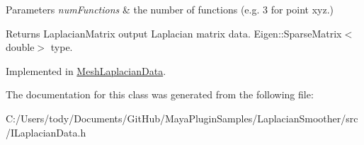 \begin{DoxyParams}{Parameters}
{\em num\+Functions} & the number of functions (e.\+g. 3 for point xyz.) \\
\hline
\end{DoxyParams}
\begin{DoxyReturn}{Returns}
Laplacian\+Matrix output Laplacian matrix data. Eigen\+::\+Sparse\+Matrix$<$double$>$ type. 
\end{DoxyReturn}


Implemented in \hyperlink{class_mesh_laplacian_data_a9efe80838593c46fac7baa77ef506559}{Mesh\+Laplacian\+Data}.



The documentation for this class was generated from the following file\+:\begin{DoxyCompactItemize}
\item 
C\+:/\+Users/tody/\+Documents/\+Git\+Hub/\+Maya\+Plugin\+Samples/\+Laplacian\+Smoother/src/I\+Laplacian\+Data.\+h\end{DoxyCompactItemize}
